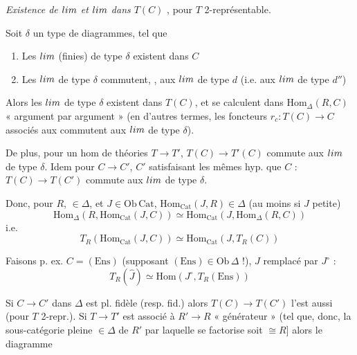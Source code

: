 \documentclass[11pt,a4paper]{article}
\begin{document}
\emph{Existence de $\varprojlim$ et $\varinjlim$ dans $T(C)$}
, pour $T$ 2-représentable.

Soit $\delta$ un type de diagrammes, tel que
\begin{enumerate}
  \item[a)] Les $\varprojlim$ (finies) de type $\delta$ existent dans
    $C$
  \item[b)] Les $\varprojlim$ de type $\delta$ commutent,  , aux $\varinjlim$ de
    type $d$ (i.e. aux $\varinjlim$ de type $d''$)
\end{enumerate}
Alors les $\varprojlim$ de type $\delta$ existent dans $T(C)$, et se
calculent dans $\mathrm{Hom}_{\Delta}(R, C)$ « argument par argument »
(en d'autres termes, les foncteurs $r_{c} : T(C) \to C$ associés aux
 commutent aux $\varprojlim$ de type
$\delta$).

De plus, pour un hom de théories $T \to T'$, $T(C) \to T'(C)$ commute aux
$\varprojlim$ de type $\delta$. Idem pour $C \to C'$, $C'$ satisfaisant
les mêmes hyp. que $C$ : $T(C) \to T(C')$ commute aux $\varprojlim$ de
type $\delta$.

Donc, pour $R$, \struck{\ill{}} $\in \Delta$, \struck{\ill{}} et $J \in
\mathrm{Ob}\,\mathrm{Cat}$, $\mathrm{Hom}_{\mathrm{Cat}}(J, R) \in \Delta$
(au moins si $J$ petite)
\[
  \mathrm{Hom}_{\Delta}(R, \mathrm{Hom}_{\mathrm{Cat}}(J, C)) \simeq
  \mathrm{Hom}_{\mathrm{Cat}}(J, \mathrm{Hom}_{\Delta}(R, C))
\]
i.e.
\[
  \boxed{\ T_{R}(\mathrm{Hom}_{\mathrm{Cat}}(J, C)) \simeq
  \mathrm{Hom}_{\mathrm{Cat}}(J, T_{R}(C))\ }
\]

Faisons p. ex. $C = (\mathrm{Ens})$ (supposant $(\mathrm{Ens}) \in
\mathrm{Ob}\,\Delta$ !), $J$ remplacé par $J^{\circ}$ :
\[
  T_{R}(\hat{J}) \simeq \mathrm{Hom}(J^{\circ}, T_{R}(\mathrm{Ens}))
\]

Si $C \to C'$ dans $\Delta$ est pl. fidèle (resp. fid.) alors $T(C) \to
T(C')$ l'est aussi (pour $T$ 2-repr.).  Si $T \to T'$ est
associé à $R' \to R$ « \add{$\Delta$-}générateur » (tel que, donc, la
sous-catégorie pleine $\in \Delta$ de $R'$ par laquelle se factorise
soit \struck{\ill{}} $\cong R$] alors le diagramme

\end{document}
